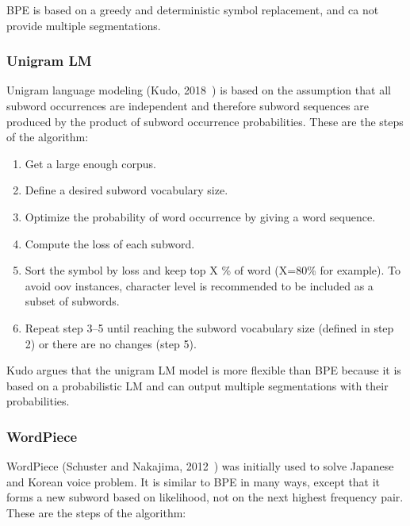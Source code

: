 BPE is based on a greedy and deterministic symbol replacement, and ca not provide multiple segmentations.

\subsubsection{Unigram LM}\label{subsubsec:unigramlm}

Unigram language modeling (Kudo, 2018~\cite{kudo-2018-subword}) is based on the assumption that all subword occurrences are independent and therefore subword sequences are produced by the product of subword occurrence probabilities. These are the steps of the algorithm:

\begin{enumerate}
    \item Get a large enough corpus.
    \item Define a desired subword vocabulary size.
    \item Optimize the probability of word occurrence by giving a word sequence.
    \item Compute the loss of each subword.
    \item Sort the symbol by loss and keep top X \% of word (X=80\% for example). To avoid oov instances, character level is recommended to be included as a subset of subwords.
    \item Repeat step 3–5 until reaching the subword vocabulary size (defined in step 2) or there are no changes (step 5).
\end{enumerate}

Kudo argues that the unigram LM model is more flexible than BPE because it is based on a probabilistic LM and can output multiple segmentations with their probabilities.

\subsubsection{WordPiece}\label{subsubsec:wordpiece}

WordPiece (Schuster and Nakajima, 2012~\cite{schuster2012japanese}) was initially used to solve Japanese and Korean voice problem. It is similar to BPE in many ways, except that it forms a new subword based on likelihood, not on the next highest frequency pair. These are the steps of the algorithm:

